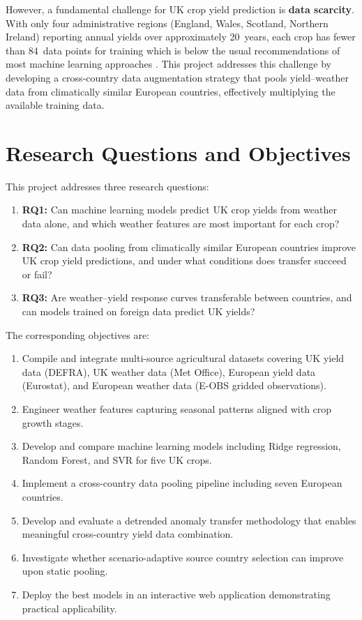 \documentclass[12pt,a4paper]{report}
\begin{document}
However, a fundamental challenge for UK crop yield prediction is \textbf{data scarcity}. With only four administrative regions (England, Wales, Scotland, Northern Ireland) reporting annual yields over approximately 20~years, each crop has fewer than 84~data points for training which is below the usual recommendations of most machine learning approaches \citep{corcoran2023}. This project addresses this challenge by developing a cross-country data augmentation strategy that pools yield--weather data from climatically similar European countries, effectively multiplying the available training data.

\section{Research Questions and Objectives}

This project addresses three research questions:

\begin{enumerate}
    \item \textbf{RQ1:} Can machine learning models predict UK crop yields from weather data alone, and which weather features are most important for each crop?
    \item \textbf{RQ2:} Can data pooling from climatically similar European countries improve UK crop yield predictions, and under what conditions does transfer succeed or fail?
    \item \textbf{RQ3:} Are weather--yield response curves transferable between countries, and can models trained on foreign data predict UK yields?
\end{enumerate}

The corresponding objectives are:

\begin{enumerate}
    \item Compile and integrate multi-source agricultural datasets covering UK yield data (DEFRA), UK weather data (Met Office), European yield data (Eurostat), and European weather data (E-OBS gridded observations).
    \item Engineer weather features capturing seasonal patterns aligned with crop growth stages.
    \item Develop and compare machine learning models including Ridge regression, Random Forest, and SVR for five UK crops.
    \item Implement a cross-country data pooling pipeline including seven European countries.
    \item Develop and evaluate a detrended anomaly transfer methodology that enables meaningful cross-country yield data combination.
    \item Investigate whether scenario-adaptive source country selection can improve upon static pooling.
    \item Deploy the best models in an interactive web application demonstrating practical applicability.
\end{enumerate}
\end{document}
